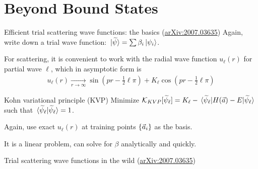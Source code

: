 \documentclass[xcolor=dvipsnames, aspectratio=169]{beamer}
\begin{document}
\section{Beyond Bound States}

\begin{frame}[t]{Efficient trial scattering wave functions: the basics (\alert{\href{https://arxiv.org/abs/2007.03635}{arXiv:2007.03635}})}
Again, write down a \alert{trial wave function}: $\ket*{\widetilde{\psi}} = \sum \beta_i \ket*{\psi_i}$.

For scattering, it is convenient to work with the radial wave function $u_\ell(r)$ for partial wave $\ell$, which in asymptotic form is
\begin{align*}
    u_\ell(r) \xrightarrow[r\to\infty]{} \sin(pr - \frac{1}{2}\ell\pi) + K_\ell \cos(pr - \frac{1}{2}\ell\pi)
\end{align*}

\begin{myblock}[valign=center]{Kohn variational principle (KVP)}
Minimize $\mathcal{K}_{KVP}[\widetilde{\psi}_\ell] = K_\ell - \mel*{\widetilde{\psi}_\ell}{H(\vec{a}) - E}{\widetilde{\psi}_\ell}$ such that $\braket*{\widetilde{\psi}_\ell}{\widetilde{\psi}_\ell} = 1$.
\end{myblock}%

Again, use exact $u_\ell(r)$ at training points $\{\vec{a}_i\}$ as the basis.

It is a linear problem, can solve for $\beta$ analytically and quickly.
\end{frame}

\begin{frame}{Trial scattering wave functions in the wild (\alert{\href{https://arxiv.org/abs/2007.03635}{arXiv:2007.03635}})}

\begin{columns}
\begin{column}{0.5\textwidth}
\end{column}
\begin{column}{0.5\textwidth}

\begin{figure}
\end{figure}
\end{column}
\end{columns}
\end{frame}
\end{document}
